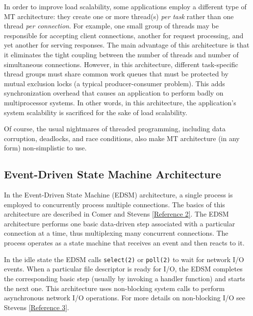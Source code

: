 \documentclass[a4paper,12pt,notitlepage,twoside,openright]{article}
\begin{document}
In order to improve load scalability, some applications employ a
different type of MT architecture: they create one or more thread(s)
\emph{per task} rather than one thread \emph{per connection}. For
example, one small group of threads may be responsible for accepting
client connections, another for request processing, and yet another for
serving responses. The main advantage of this architecture is that it
eliminates the tight coupling between the number of threads and number
of simultaneous connections. However, in this architecture, different
task-specific thread groups must share common work queues that must be
protected by mutual exclusion locks (a typical producer-consumer
problem). This adds synchronization overhead that causes an application
to perform badly on multiprocessor systems. In other words, in this
architecture, the application's system scalability is sacrificed for the
sake of load scalability.

Of course, the usual nightmares of threaded programming, including data
corruption, deadlocks, and race conditions, also make MT architecture
(in any form) non-simplistic to use.

\protect\hypertarget{EDSM}{}{}

\hypertarget{event-driven-state-machine-architecture}{%
\subsection{Event-Driven State Machine
Architecture}\label{event-driven-state-machine-architecture}}

In the Event-Driven State Machine (EDSM) architecture, a single process
is employed to concurrently process multiple connections. The basics of
this architecture are described in Comer and Stevens
\protect\hyperlink{refs2}{{[}Reference 2{]}}. The EDSM architecture
performs one basic data-driven step associated with a particular
connection at a time, thus multiplexing many concurrent connections. The
process operates as a state machine that receives an event and then
reacts to it.

In the idle state the EDSM calls \texttt{select(2)} or \texttt{poll(2)}
to wait for network I/O events. When a particular file descriptor is
ready for I/O, the EDSM completes the corresponding basic step (usually
by invoking a handler function) and starts the next one. This
architecture uses non-blocking system calls to perform asynchronous
network I/O operations. For more details on non-blocking I/O see Stevens
\protect\hyperlink{refs3}{{[}Reference 3{]}}.
\end{document}
